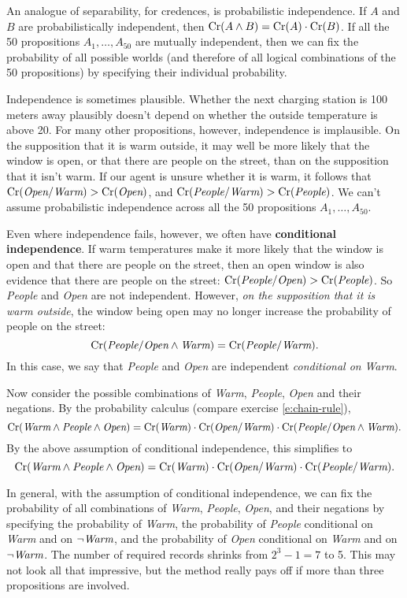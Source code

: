 An analogue of separability, for credences, is probabilistic independence. If
$A$ and $B$ are probabilistically independent, then
$\text{Cr}(A\land B) = \text{Cr}(A) \cdot \text{Cr}(B)$. If all the 50 propositions
$A_1,\ldots,A_{50}$ are mutually independent, then we can fix the probability of
all possible worlds (and therefore of all logical combinations of the 50
propositions) by specifying their individual probability.

Independence is sometimes plausible. Whether the next charging station is 100
meters away plausibly doesn't depend on whether the outside temperature is above
20\celsius. For many other propositions, however, independence is implausible.
On the supposition that it is warm outside, it may well be more likely that the
window is open, or that there are people on the street, than on the supposition
that it isn't warm. If our agent is unsure whether it is warm, it follows that
$\text{Cr}(\emph{Open}/\emph{Warm}) > \text{Cr}(\emph{Open})$, and
$\text{Cr}(\emph{People}/\emph{Warm}) > \text{Cr}(\emph{People})$. We can't assume
probabilistic independence across all the 50 propositions $A_1,\ldots,A_{50}$.

Even where independence fails, however, we often have \textbf{conditional
  independence}. If warm temperatures make it more likely that the window is
open and that there are people on the street, then an open window is also
evidence that there are people on the street:
$\text{Cr}(\emph{People}/\emph{Open}) > \text{Cr}(\emph{People})$. So \emph{People} and
\emph{Open} are not independent. However, \emph{on the supposition that it is
  warm outside}, the window being open may no longer increase the probability of
people on the street:
\[
  \text{Cr}(\emph{People}/\emph{Open} \land \emph{Warm}) = \text{Cr}(\emph{People}/ \emph{Warm}).
\]
In this case, we say that \emph{People} and \emph{Open} are independent
\emph{conditional on} \emph{Warm}.

Now consider the possible combinations of \emph{Warm}, \emph{People},
\emph{Open} and their negations. By the probability calculus (compare exercise
\ref{e:chain-rule}),
\[
  \text{Cr}(\emph{Warm} \land \emph{People} \land \emph{Open}) = \text{Cr}(\emph{Warm}) \cdot \text{Cr}(\emph{Open}/\emph{Warm}) \cdot \text{Cr}(\emph{People}/\emph{Open} \land \emph{Warm}).
\]
By the above assumption of conditional independence, this simplifies to
\[
  \text{Cr}(\emph{Warm} \land \emph{People} \land \emph{Open}) = \text{Cr}(\emph{Warm}) \cdot \text{Cr}(\emph{Open}/\emph{Warm}) \cdot \text{Cr}(\emph{People}/\emph{Warm}).
\]

In general, with the assumption of conditional independence, we can fix the
probability of all combinations of \emph{Warm}, \emph{People}, \emph{Open}, and
their negations by specifying the probability of \emph{Warm}, the probability of
\emph{People} conditional on \emph{Warm} and on $\neg\emph{Warm}$, and the
probability of \emph{Open} conditional on \emph{Warm} and on $\neg\emph{Warm}$.
The number of required records shrinks from $2^3-1 = 7$ to 5. This may
not look all that impressive, but the method really pays off if more than three
propositions are involved.

